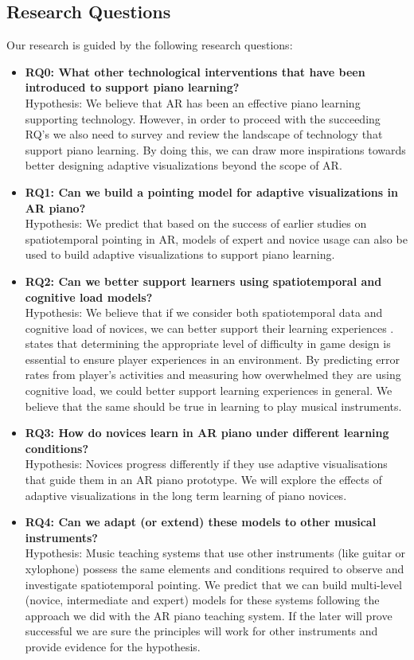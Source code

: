 \documentclass[manuscript,screen]{acmart}
\begin{document}
\subsection{Research Questions}
Our research is guided by the following research questions: 
\begin{itemize}
    \item \textbf{RQ0: What other technological interventions that have been introduced to support piano learning?}\\
    Hypothesis: We believe that AR has been an effective piano learning supporting technology. However, in order to proceed with the succeeding RQ's we also need to survey and review the landscape of technology that support piano learning. By doing this, we can draw more inspirations towards better designing adaptive visualizations beyond the scope of AR. 
    \item \textbf{RQ1: Can we build a pointing model for adaptive visualizations in AR piano?} \\
    Hypothesis: We predict that based on the success of earlier studies on spatiotemporal pointing in AR, models of expert and novice usage can also be used to build adaptive visualizations to support piano learning. 
    \item \textbf{RQ2: Can we better support learners using spatiotemporal and cognitive load models?}\\
    Hypothesis: We believe that if we consider both spatiotemporal data and cognitive load of novices, we can better support their learning experiences \cite{rikers2004cognitive}.  \citet{lee2016website} states that determining the appropriate level of difficulty in game design is essential to ensure player experiences in an environment. By predicting error rates from player’s activities and measuring how overwhelmed they are using cognitive load, we could better support learning experiences in general. We believe that the same should be true in learning to play musical instruments.
    \item \textbf{RQ3: How do novices learn in AR piano under different learning conditions?}\\
    Hypothesis: Novices progress differently if they use adaptive visualisations that guide them in an AR piano prototype. We will explore the effects of adaptive visualizations in the long term learning of piano novices. 
    \item \textbf{RQ4: Can we adapt (or extend) these models to other musical instruments?}\\
    Hypothesis: Music teaching systems that use other instruments (like guitar or xylophone) possess the same elements and conditions required to observe and investigate spatiotemporal pointing. We predict that we can build multi-level (novice, intermediate and expert) models for these systems following the approach we did with the AR piano teaching system. If the later will prove successful we are sure the principles will work for other instruments and provide evidence for the hypothesis. 
\end{itemize}
\end{document}
